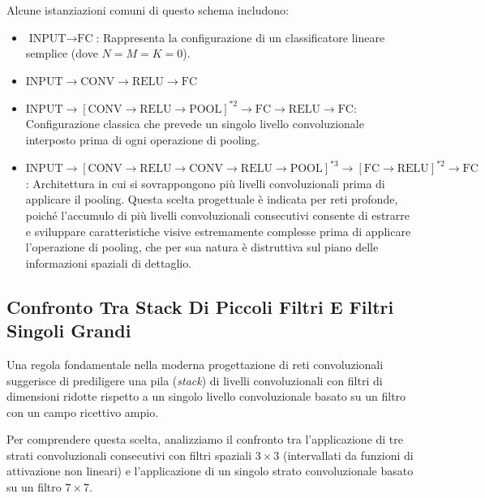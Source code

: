 ﻿\documentclass[11pt, a4paper]{article}
\begin{document}
Alcune istanziazioni comuni di questo schema includono:
\begin{itemize}
    \item $\text{INPUT} \rightarrow \text{FC}$: Rappresenta la configurazione di un classificatore lineare semplice (dove $N = M = K = 0$).
    \item $\text{INPUT} \rightarrow \text{CONV} \rightarrow \text{RELU} \rightarrow \text{FC}$
    \item $\text{INPUT} \rightarrow [\text{CONV} \rightarrow \text{RELU} \rightarrow \text{POOL}]^{*2} \rightarrow \text{FC} \rightarrow \text{RELU} \rightarrow \text{FC}$: Configurazione classica che prevede un singolo livello convoluzionale interposto prima di ogni operazione di pooling.
    \item $\text{INPUT} \rightarrow [\text{CONV} \rightarrow \text{RELU} \rightarrow \text{CONV} \rightarrow \text{RELU} \rightarrow \text{POOL}]^{*3} \rightarrow [\text{FC} \rightarrow \text{RELU}]^{*2} \rightarrow \text{FC}$: Architettura in cui si sovrappongono più livelli convoluzionali prima di applicare il pooling. Questa scelta progettuale è indicata per reti profonde, poiché l'accumulo di più livelli convoluzionali consecutivi consente di estrarre e sviluppare caratteristiche visive estremamente complesse prima di applicare l'operazione di pooling, che per sua natura è distruttiva sul piano delle informazioni spaziali di dettaglio.
\end{itemize}

\subsection{Confronto Tra Stack Di Piccoli Filtri E Filtri Singoli Grandi}

Una regola fondamentale nella moderna progettazione di reti convoluzionali suggerisce di prediligere una pila (\emph{stack}) di livelli convoluzionali con filtri di dimensioni ridotte rispetto a un singolo livello convoluzionale basato su un filtro con un campo ricettivo ampio.

Per comprendere questa scelta, analizziamo il confronto tra l'applicazione di tre strati convoluzionali consecutivi con filtri spaziali $3 \times 3$ (intervallati da funzioni di attivazione non lineari) e l'applicazione di un singolo strato convoluzionale basato su un filtro $7 \times 7$.
\end{document}
